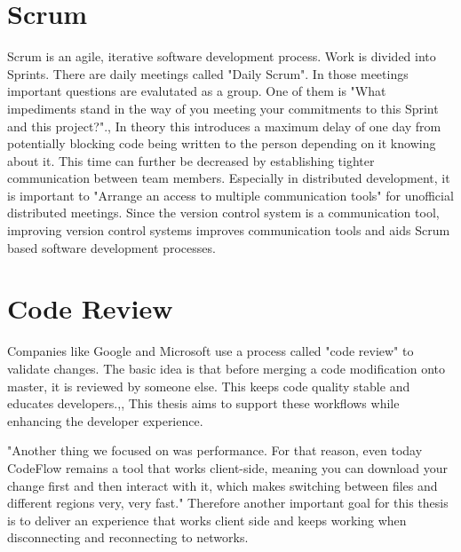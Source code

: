 \section{Scrum}
Scrum is an agile, iterative software development process. Work is divided into Sprints. There are daily meetings called "Daily Scrum". In those meetings important questions are evalutated as a group. One of them is "What impediments stand in the way of you meeting your commitments to this Sprint and this project?".\cite{schwaber2004agile},\cite{10.1007/978-1-4471-0947-1_11}
In theory this introduces a maximum delay of one day from potentially blocking code being written to the person depending on it knowing about it. This time can further be decreased by establishing tighter communication between team members.
Especially in distributed development, it is important to "Arrange an access to multiple communication tools"\cite{5196933} for unofficial distributed meetings.\cite{4638656}
Since the version control system is a communication tool, improving version control systems improves communication tools and aids Scrum based software development processes.

\section{Code Review}

Companies like Google and Microsoft use a process called "code review" to validate changes. The basic idea is that before merging a code modification onto master, it is reviewed by someone else. This keeps code quality stable and educates developers.\cite{SadowskiSoederbergChurchSipkoBacchelli:2018:Moderncodereview:acasestudyatgoogle},\cite{Bacchelli:2013:EOC:2486788.2486882},\cite{7081824} This thesis aims to support these workflows while enhancing the developer experience. 

"Another thing we focused on was performance. For that
reason, even today CodeFlow remains a tool that works
client-side, meaning you can download your change first
and then interact with it, which makes switching between
files and different regions very, very fast."\cite{CzerwonkaGreilerBirdPanjerCoatta:2018:CodeFlow:ImprovingtheCodeReviewProcessatMicrosoft} Therefore another important goal for this thesis is to deliver an experience that works client side and keeps working when disconnecting and reconnecting to networks.